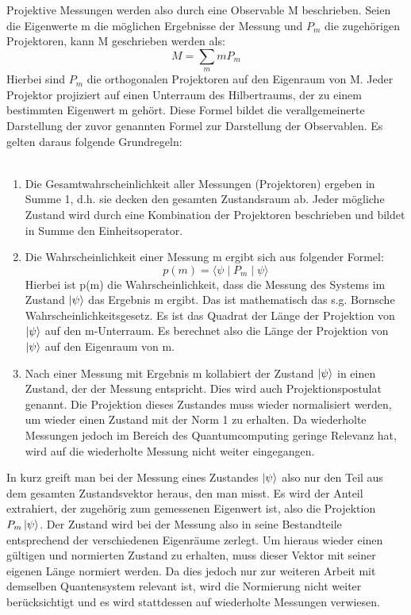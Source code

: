 Projektive Messungen werden also durch eine Observable M beschrieben. Seien die Eigenwerte m die möglichen Ergebnisse der Messung und $P_m$ die zugehörigen Projektoren, kann M geschrieben werden als:
\begin{equation}
    M = \sum_m mP_m
\end{equation}
Hierbei sind $P_m$ die orthogonalen Projektoren auf den Eigenraum von M. Jeder Projektor projiziert auf einen Unterraum des Hilbertraums, der zu einem bestimmten Eigenwert m gehört. Diese Formel bildet die verallgemeinerte Darstellung der zuvor genannten Formel zur Darstellung der Observablen. %
Es gelten daraus folgende Grundregeln: \\ \\
\begin{enumerate}
\item Die Gesamtwahrscheinlichkeit aller Messungen (Projektoren) ergeben in Summe 1, d.h. sie decken den gesamten Zustandsraum ab. Jeder mögliche Zustand wird durch eine Kombination der Projektoren beschrieben und bildet in Summe den Einheitsoperator. \\
\item Die Wahrscheinlichkeit einer Messung m ergibt sich aus folgender Formel:
\begin{equation}
    p(m) = \langle \psi \mid P_m \mid \psi \rangle
\end{equation}
Hierbei ist p(m) die Wahrscheinlichkeit, dass die Messung des Systems im Zustand $\ket\psi$ das Ergebnis m ergibt. Das ist mathematisch das s.g. Bornsche Wahrscheinlichkeitsgesetz.
Es ist das Quadrat der Länge der Projektion von $\ket\psi$ auf den m-Unterraum. Es berechnet also die Länge der Projektion von $\ket\psi$ auf den Eigenraum von m. \\
\item Nach einer Messung mit Ergebnis m kollabiert der Zustand $\ket\psi$ in einen Zustand, der der Messung entspricht. Dies wird auch Projektionspostulat genannt. Die Projektion dieses Zustandes muss wieder normalisiert werden, um wieder einen Zustand mit der Norm 1 zu erhalten.
Da wiederholte Messungen jedoch im Bereich des Quantumcomputing geringe Relevanz hat, wird auf die wiederholte Messung nicht weiter eingegangen. \\ 
\end{enumerate}

In kurz greift man bei der Messung eines Zustandes $\ket\psi$ also nur den Teil aus dem gesamten Zustandsvektor heraus, den man misst. Es wird der Anteil extrahiert, der zugehörig zum gemessenen Eigenwert ist, also die Projektion $P_m \ket\psi$. Der Zustand wird bei der Messung also in seine Bestandteile entsprechend der verschiedenen Eigenräume zerlegt. Um hieraus wieder einen gültigen und normierten Zustand zu erhalten, muss dieser Vektor mit seiner eigenen Länge normiert werden. Da dies jedoch nur zur weiteren Arbeit mit demselben Quantensystem relevant ist, wird die Normierung nicht weiter berücksichtigt und es wird stattdessen auf wiederholte Messungen verwiesen.
\cite{kasirajan_fundamentals_2021} 

